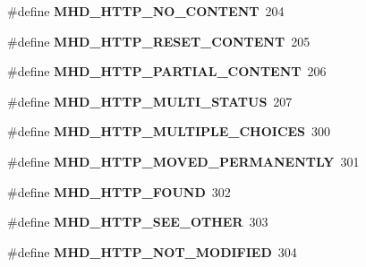 \begin{DoxyCompactItemize}
\item 
\hypertarget{group__httpcode_gad8855eda2f04ce43e72d29ca821582fe}{\#define {\bfseries \-M\-H\-D\-\_\-\-H\-T\-T\-P\-\_\-\-N\-O\-\_\-\-C\-O\-N\-T\-E\-N\-T}~204}\label{group__httpcode_gad8855eda2f04ce43e72d29ca821582fe}

\item 
\hypertarget{group__httpcode_ga6a5ce275fe99548dd17be7f24a7dce3f}{\#define {\bfseries \-M\-H\-D\-\_\-\-H\-T\-T\-P\-\_\-\-R\-E\-S\-E\-T\-\_\-\-C\-O\-N\-T\-E\-N\-T}~205}\label{group__httpcode_ga6a5ce275fe99548dd17be7f24a7dce3f}

\item 
\hypertarget{group__httpcode_ga9747071e1bf0cacd2fd935a1fd888895}{\#define {\bfseries \-M\-H\-D\-\_\-\-H\-T\-T\-P\-\_\-\-P\-A\-R\-T\-I\-A\-L\-\_\-\-C\-O\-N\-T\-E\-N\-T}~206}\label{group__httpcode_ga9747071e1bf0cacd2fd935a1fd888895}

\item 
\hypertarget{group__httpcode_gaa3d051b6708b9b9e5b7261ca515601f6}{\#define {\bfseries \-M\-H\-D\-\_\-\-H\-T\-T\-P\-\_\-\-M\-U\-L\-T\-I\-\_\-\-S\-T\-A\-T\-U\-S}~207}\label{group__httpcode_gaa3d051b6708b9b9e5b7261ca515601f6}

\item 
\hypertarget{group__httpcode_ga956765f92dbcb6820f3cba60df073fbd}{\#define {\bfseries \-M\-H\-D\-\_\-\-H\-T\-T\-P\-\_\-\-M\-U\-L\-T\-I\-P\-L\-E\-\_\-\-C\-H\-O\-I\-C\-E\-S}~300}\label{group__httpcode_ga956765f92dbcb6820f3cba60df073fbd}

\item 
\hypertarget{group__httpcode_ga1b884efb4795dd0ccbcc5721c3e14c2f}{\#define {\bfseries \-M\-H\-D\-\_\-\-H\-T\-T\-P\-\_\-\-M\-O\-V\-E\-D\-\_\-\-P\-E\-R\-M\-A\-N\-E\-N\-T\-L\-Y}~301}\label{group__httpcode_ga1b884efb4795dd0ccbcc5721c3e14c2f}

\item 
\hypertarget{group__httpcode_ga5e512edf28868f396cb739ad3dd736ee}{\#define {\bfseries \-M\-H\-D\-\_\-\-H\-T\-T\-P\-\_\-\-F\-O\-U\-N\-D}~302}\label{group__httpcode_ga5e512edf28868f396cb739ad3dd736ee}

\item 
\hypertarget{group__httpcode_gaa79c22aa7c1d4639f1a5cd635ea533fb}{\#define {\bfseries \-M\-H\-D\-\_\-\-H\-T\-T\-P\-\_\-\-S\-E\-E\-\_\-\-O\-T\-H\-E\-R}~303}\label{group__httpcode_gaa79c22aa7c1d4639f1a5cd635ea533fb}

\item 
\hypertarget{group__httpcode_gab54c632d5d3723e2865e81fc17d6129c}{\#define {\bfseries \-M\-H\-D\-\_\-\-H\-T\-T\-P\-\_\-\-N\-O\-T\-\_\-\-M\-O\-D\-I\-F\-I\-E\-D}~304}\label{group__httpcode_gab54c632d5d3723e2865e81fc17d6129c}


\end{DoxyCompactItemize}
